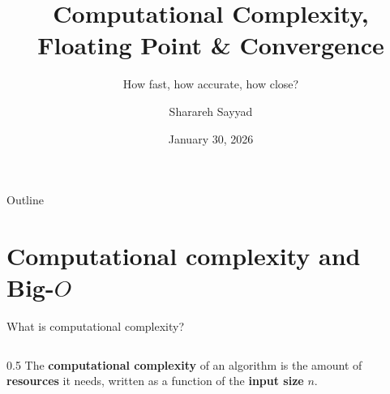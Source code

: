 \documentclass[aspectratio=169]{beamer}
\title{Computational Complexity, Floating Point \& Convergence}
\subtitle{How fast, how accurate, how close?}
\author{Sharareh Sayyad}
\institute{Washington State University}
\date{January 30, 2026}
\begin{document}
\frame{\titlepage}

\begin{frame}{Outline}
\tableofcontents
\end{frame}

\section{Computational complexity and Big-$O$}

\begin{frame}{What is computational complexity?}
\begin{columns}[c]
\begin{column}{0.5\textwidth}
\small
The \textbf{computational complexity} of an algorithm is the amount of
\textbf{resources} it needs, written as a function of the \textbf{input size} $n$.


\end{column}
\end{columns}
\end{frame}
\end{document}
